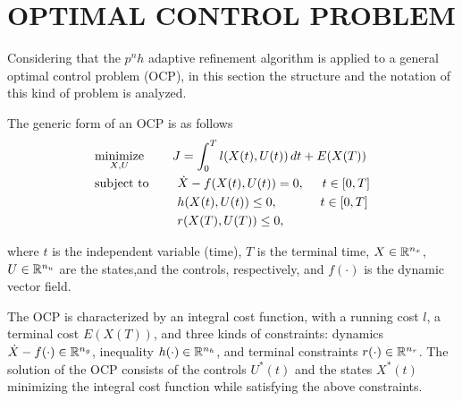 \section*{OPTIMAL CONTROL PROBLEM}

Considering that the $p^{n}h$ adaptive refinement algorithm is applied to a general optimal control problem (OCP), in this section the structure and the notation of this kind of problem is analyzed.


The generic form of an OCP is as follows
\begin{equation}\label{OCP}
	\begin{split}
		&\underset{X,U}{\text{minimize}}\hspace{8mm} J = \int_{0}^{T}l(X(t),U(t))\,dt + E(X(T))\\
		&\begin{split}
			\text{subject to} \hspace{8mm} & \dot{X} -  f(X(t),U(t))			= 0, \hspace{5mm} t \in[0,T]\\
			& h(X(t),U(t)) \leq 0,  \hspace{12mm} t \in[0,T]\\
			& r(X(T),U(T)) \leq 0,
		\end{split}		
	\end{split}
\end{equation}



where $t$ is the independent variable (time), $T$ is the terminal time, $X \in \mathbb{R}^{n_{x}}$, $U \in \mathbb{R}^{n_{u}}$ are the states,and the controls, respectively, and $f (\cdot)$ is the dynamic vector field. 

The OCP is characterized by an integral cost function, with a running cost $l$, a terminal cost $E(X(T))$, and three kinds of constraints: dynamics $\dot{X}-f(\cdot) \in \mathbb{R}^{n_{g}}$, inequality $h(\cdot) \in \mathbb{R}^{n_{h}}$, and terminal constraints $r(\cdot) \in \mathbb{R}^{n_{r}}$.
The solution of the OCP  consists of the controls $U^{*}(t)$ and the states $X^*(t)$  minimizing the integral cost function while satisfying the above constraints.

